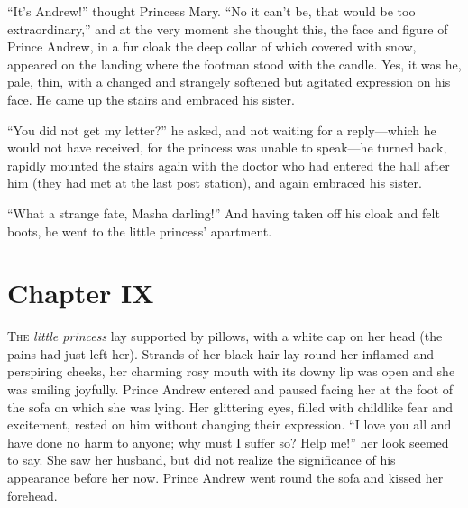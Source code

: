 ``It's Andrew!'' thought Princess Mary. ``No it can't be, that
would be too extraordinary,'' and at the very moment she thought
this, the face and figure of Prince Andrew, in a fur cloak the
deep collar of which covered with snow, appeared on the landing
where the footman stood with the candle. Yes, it was he, pale,
thin, with a changed and strangely softened but agitated
expression on his face. He came up the stairs and embraced his
sister.

``You did not get my letter?'' he asked, and not waiting for a
reply---which he would not have received, for the princess was
unable to speak---he turned back, rapidly mounted the stairs
again with the doctor who had entered the hall after him (they
had met at the last post station), and again embraced his sister.

``What a strange fate, Masha darling!'' And having taken off his
cloak and felt boots, he went to the little princess' apartment.


\chapter*{Chapter IX}
\ifaudio     
{} 
\fi

\lettrine[lines=2, loversize=0.3, lraise=0]{\initfamily T}{he}
\emph{little princess} lay supported by pillows, with a white cap on
her head (the pains had just left her). Strands of her black hair
lay round her inflamed and perspiring cheeks, her charming rosy
mouth with its downy lip was open and she was smiling
joyfully. Prince Andrew entered and paused facing her at the foot
of the sofa on which she was lying.  Her glittering eyes, filled
with childlike fear and excitement, rested on him without
changing their expression. ``I love you all and have done no harm
to anyone; why must I suffer so? Help me!'' her look seemed to
say. She saw her husband, but did not realize the significance of
his appearance before her now. Prince Andrew went round the sofa
and kissed her forehead.

